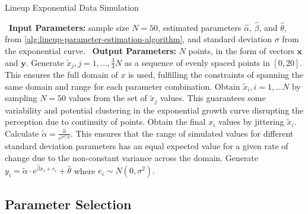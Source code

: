 \documentclass[12pt]{article}
\begin{document}
\begin{algorithm}
  \caption{Lineup Exponential Data Simulation}\label{alg:lineup-exponential-data-simulation-algorithm}
  \begin{algorithmic}[1]
    \Statex \hspace*{-1em}\textbullet~\textbf{Input Parameters:} sample size $N = 50$, estimated parameters $\hat\alpha$, $\hat\beta$, and $\hat\theta$, from \cref{alg:lineup-parameter-estimation-algorithm}, and standard deviation $\sigma$ from the exponential curve.
    \Statex \hspace*{-1em}\textbullet~\textbf{Output Parameters:} $N$ points, in the form of vectors $\mathbf{x}$ and $\mathbf{y}$.
    \State Generate $\tilde x_j, j = 1,..., \frac{3}{4}N$ as a sequence of evenly spaced points in $[0,20]$. This ensures the full domain of $x$ is used, fulfilling the constraints of spanning the same domain and range for each parameter combination.
    \State Obtain $\tilde x_i, i = 1,...N$ by sampling $N = 50$ values from the set of $\tilde x_j$ values. This guarantees some variability and potential clustering in the exponential growth curve disrupting the perception due to continuity of points.
    \State Obtain the final $x_i$ values by jittering $\tilde x_i$.
    \State Calculate $\tilde\alpha = \frac{\hat\alpha}{e^{\sigma^2/2}}.$ This ensures that the range of simulated values for different standard deviation parameters has an equal expected value for a given rate of change due to the non-constant variance across the domain.
    \State Generate $y_i = \tilde\alpha\cdot e^{\hat\beta x_i + e_i}+\hat\theta$ where $e_i\sim N(0,\sigma^2).$
  \end{algorithmic}
\end{algorithm}

\hypertarget{lineups-parameter-selection}{%
\subsection{Parameter Selection}\label{lineups-parameter-selection}}
\end{document}
